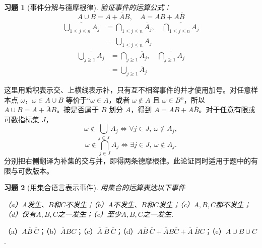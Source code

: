 \documentclass[UTF8,12pt,a4paper,fontset=fandol]{ctexart}
\newtheorem{exercise}{习题}[section]
\begin{document}
\begin{exercise}[事件分解与德摩根律]\label{q:Y1.1}
验证事件的运算公式：
\[
A\cup B=A+\overline{A}B,\quad A=AB+A\overline{B}
\]
\[\begin{aligned}\overline {\bigcup\limits_{1 \leqslant j \leqslant n} {{A_j}} }  &= \bigcap\limits_{1 \leqslant j \leqslant n} {{{\overline A }_j}},\quad  \overline {\bigcap\limits_{1 \leqslant j \leqslant n} {{A_j}} }  \\&= \bigcup\limits_{1 \leqslant j \leqslant n} {{{\overline A }_j}} \end{aligned}\]
\[\begin{aligned}\overline {\bigcup\limits_{j \geqslant 1} {{A_j}} }  &= \bigcap\limits_{j \geqslant 1} {{{\overline A }_j}},\quad  \overline {\bigcap\limits_{j \geqslant 1} {{A_j}} }  \\&= \bigcup\limits_{j \geqslant 1} {{{\overline A }_j}} \end{aligned}\]\par{}
\end{exercise}

\begin{solve}\label{a:Y1.1}这里用乘积表示交、上横线表示补，只有互不相容事件的并才使用加号。对任意样本点 $\omega$，$\omega\in A\cup B$ 等价于“$\omega\in A$，或者 $\omega\notin A$ 且 $\omega\in B$”，所以 $A\cup B=A+\overline AB$。按是否属于 $B$ 划分 $A$，得到 $A=AB+A\overline B$。对于任意有限或可数指标集 $J$，\[\omega\notin\bigcup_{j\in J}A_j\iff\forall j\in J,\ \omega\notin A_j,\]\[\omega\notin\bigcap_{j\in J}A_j\iff\exists j\in J,\ \omega\notin A_j.\]分别把右侧翻译为补集的交与并，即得两条德摩根律。此论证同时适用于题中的有限与可数版本。\end{solve}

\begin{exercise}[用集合语言表示事件]\label{q:Y1.2}
用集合的运算表达以下事件

（a）$A$发生、$B$和$C$不发生；（b）$A$不发生、$B$和$C$发生；（c）$A,B,C$都不发生；（d）仅有$A,B,C$之一发生；（e）至少$A,B,C$之一发生.\par{}
\end{exercise}

\begin{solve}\label{a:Y1.2}
（a）$A\overline{B}\:{\overline{C}}$；（b）$\overline{A}BC$；（c）$\overline{A}\:\overline{B}\:\overline{C}$；（d）$A\overline{B}\:\overline{C}+\overline{A}B\overline{C}+\overline{A}\:\overline{B}C$；（e）$A\cup B\cup C$.
\end{solve}
\end{document}
